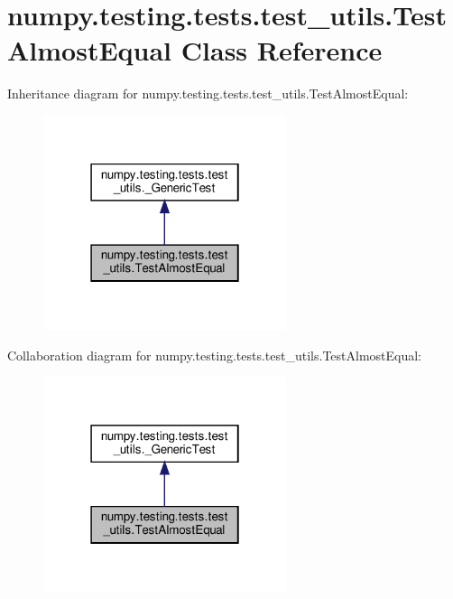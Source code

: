 \hypertarget{classnumpy_1_1testing_1_1tests_1_1test__utils_1_1TestAlmostEqual}{}\section{numpy.\+testing.\+tests.\+test\+\_\+utils.\+Test\+Almost\+Equal Class Reference}
\label{classnumpy_1_1testing_1_1tests_1_1test__utils_1_1TestAlmostEqual}


Inheritance diagram for numpy.\+testing.\+tests.\+test\+\_\+utils.\+Test\+Almost\+Equal\+:
\nopagebreak
\begin{figure}[H]
\begin{center}
\leavevmode
\includegraphics[width=202pt]{classnumpy_1_1testing_1_1tests_1_1test__utils_1_1TestAlmostEqual__inherit__graph}
\end{center}
\end{figure}


Collaboration diagram for numpy.\+testing.\+tests.\+test\+\_\+utils.\+Test\+Almost\+Equal\+:
\nopagebreak
\begin{figure}[H]
\begin{center}
\leavevmode
\includegraphics[width=202pt]{classnumpy_1_1testing_1_1tests_1_1test__utils_1_1TestAlmostEqual__coll__graph}
\end{center}
\end{figure}
